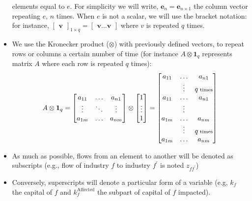 \documentclass[main.tex]{subfiles}
\begin{document}
\begin{itemize}
  elements equal to $e$. For simplicity we will write, $\bm{e}_n = \bm{e}_{n
    \times 1}$ the column vector repeating $e$, $n$ times. When $e$ is not a
  scalar, we will use the bracket notation: for
  instance, $\begin{bmatrix}\bm{v}\end{bmatrix}_{1 \times q}
  = \begin{bmatrix}\bm{v} \hdots \bm{v}  \end{bmatrix}$ where $v$ is repeated $q$ times.
\item We use the Kronecker product ($\otimes$) with previously defined vectors,
  to repeat rows or columns a certain number of time (for instance
  $A \otimes \bm{1}_q$ represents matrix $A$
  where each row is repeated $q$ times):
  \[
    A \otimes \bm{1}_q =
    \begin{bmatrix}
      a_{11} & \hdots & a_{n1} \\
      \vdots & \ddots & \vdots \\
      a_{1m} & \hdots & a_{nm} \\
    \end{bmatrix}
    \otimes
    \begin{bmatrix}
      1\\
      \vdots\\
      1
    \end{bmatrix} =
    \begin{bmatrix}
      a_{11} & \hdots & a_{n1} \\
             & \vdots  & q\textrm{\scriptsize{} times} \\
      a_{11} & \hdots & a_{n1} \\
             & \vdots & \\
      a_{1m} & \hdots & a_{nm} \\
             & \vdots & q\textrm{\scriptsize{} times} \\
      a_{1m} & \hdots & a_{nm}
    \end{bmatrix}
  \]
\item As much as possible, flows from an element to another will be denoted as
  subscripts (e.g., flow of industry $f$ to industry $f^{\prime}$ is noted
  $z_{ff^{\prime}}$)
\item Conversely, superscripts will denote a particular form of a variable (e.g,
  $k_f$ the capital of $f$ and $k_f^{\textrm{Affected}}$ the subpart of capital
  of $f$ impacted).
\end{itemize}
\end{document}

